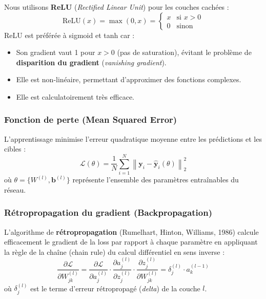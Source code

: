 \documentclass[journal, a4paper, twocolumn]{IEEEtran}
\begin{document}
Nous utilisons \textbf{ReLU} (\textit{Rectified Linear Unit}) pour les couches cachées :
\begin{equation}
    \text{ReLU}(x) = \max(0, x) = \begin{cases} x & \text{si } x > 0 \\ 0 & \text{sinon} \end{cases}
\end{equation}
ReLU est préférée à sigmoid et tanh car :
\begin{itemize}
    \item Son gradient vaut 1 pour $x > 0$ (pas de saturation), évitant le problème de \textbf{disparition du gradient} (\textit{vanishing gradient}).
    \item Elle est non-linéaire, permettant d'approximer des fonctions complexes.
    \item Elle est calculatoirement très efficace.
\end{itemize}

\subsubsection{Fonction de perte (Mean Squared Error)}

L'apprentissage minimise l'erreur quadratique moyenne entre les prédictions et les cibles :
\begin{equation}
    \mathcal{L}(\theta) = \frac{1}{N} \sum_{i=1}^{N} \left\| \bm{y}_i - \hat{\bm{y}}_i(\theta) \right\|_2^2
\end{equation}
où $\theta = \{W^{(l)}, \bm{b}^{(l)}\}$ représente l'ensemble des paramètres entraînables du réseau.

\subsubsection{Rétropropagation du gradient (Backpropagation)}

L'algorithme de \textbf{rétropropagation} (Rumelhart, Hinton, Williams, 1986) calcule efficacement le gradient de la loss par rapport à chaque paramètre en appliquant la règle de la chaîne (chain rule) du calcul différentiel en sens inverse :
\begin{equation}
    \frac{\partial \mathcal{L}}{\partial W_{jk}^{(l)}} = \frac{\partial \mathcal{L}}{\partial a_j^{(l)}} \cdot \frac{\partial a_j^{(l)}}{\partial z_j^{(l)}} \cdot \frac{\partial z_j^{(l)}}{\partial W_{jk}^{(l)}} = \delta_j^{(l)} \cdot a_k^{(l-1)}
\end{equation}
où $\delta_j^{(l)}$ est le terme d'erreur rétropropagé (\textit{delta}) de la couche $l$.
\end{document}
